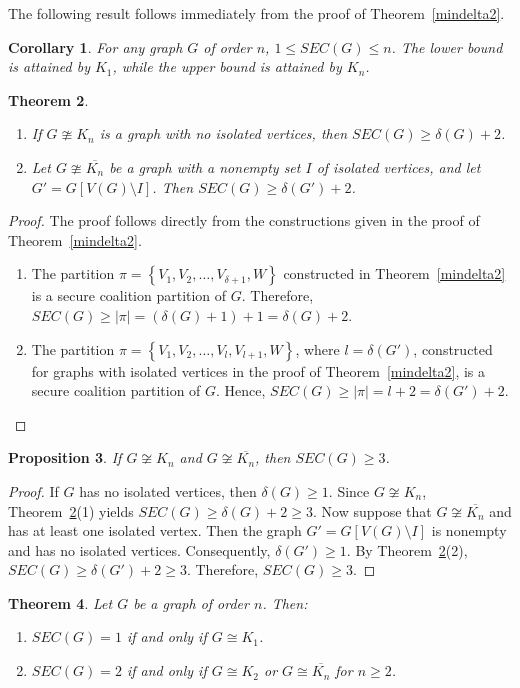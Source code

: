\documentclass[12pt]{article}
\newtheorem{theorem}{Theorem}[section]
\newtheorem{corollary}[theorem]{Corollary}
\newtheorem{proposition}[theorem]{Proposition}
\begin{document}
    The following result follows immediately from the proof of Theorem~\ref{mindelta2}.
\begin{corollary}
For any graph $G$ of order $n$,
$1 \le SEC(G) \le n$.
The lower bound is attained by $K_1$, while the upper bound is attained by $K_n$.
\end{corollary}
\begin{theorem}\label{theodelta}
\begin{enumerate}
\item If $G\ncong K_n$ is a graph with no isolated vertices, then
$SEC(G)\ge \delta(G)+2$.
\item Let $G\ncong \overline{K_n}$ be a graph with a nonempty set $I$ of isolated vertices, and let $G'=G[V(G)\setminus I]$.
Then $SEC(G)\ge \delta(G')+2$.
\end{enumerate}
\end{theorem}
\begin{proof}
The proof follows directly from the constructions given in the proof of Theorem~\ref{mindelta2}.
\begin{enumerate}
\item The partition $\pi=\left\{V_1,V_2,\ldots,V_{\delta+1},W\right\}$
constructed in  Theorem~\ref{mindelta2} is a secure coalition partition of $G$. Therefore, $SEC(G)\ge |\pi| =(\delta(G)+1)+1 =\delta(G)+2.$
\item The partition $\pi=\left\{V_1,V_2,\ldots,V_l,V_{l+1},W\right\}$, where $l=\delta(G')$, constructed for graphs with isolated vertices in the proof of Theorem~\ref{mindelta2}, is a secure coalition partition of $G$. Hence, $SEC(G)\ge |\pi|=l+2 =\delta(G')+2$.
\end{enumerate}
\end{proof}
\begin{proposition}\label{knoverline}
If $G\not\cong K_n$ and $G\not\cong \overline{K_n}$, then
$SEC(G)\ge 3$.
\end{proposition}
\begin{proof}
If $G$ has no isolated vertices, then $\delta(G)\ge 1$. Since $G\not\cong K_n$, Theorem~\ref{theodelta}(1) yields
$SEC(G)\ge \delta(G)+2\ge 3$. Now suppose that  $G\not\cong \overline{K_n}$ and has at least one isolated vertex. Then the graph $G'=G[V(G)\setminus I]$
is nonempty and has no isolated vertices. Consequently,
$\delta(G')\ge 1$. By Theorem~\ref{theodelta}(2),
$SEC(G)\ge \delta(G')+2\ge 3$. Therefore,  $SEC(G)\ge 3$.
\end{proof}
\begin{theorem}\label{12cor}
Let $G$ be a graph of order $n$. Then:
\begin{enumerate}
\item $SEC(G)=1$ if and only if $G\cong K_1$.
\item $SEC(G)=2$ if and only if $G\cong K_2$ or $G\cong \overline{K_n}$ for $n\ge 2$.
\end{enumerate}
\end{theorem}
\end{document}

